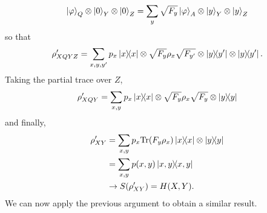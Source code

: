 \documentclass[a4paper, 12pt]{article}
\numberwithin{equation}{section}
\numberwithin{figure}{section}
\theoremstyle{definition}
\begin{document}
    \begin{align}
        \ket{\varphi}_Q \otimes \ket{0}_Y \otimes \ket{0}_Z = \sum_y \sqrt{F_y} \ket{\varphi}_A \otimes \ket{y}_Y \otimes \ket{y}_Z
    \end{align}
    so that
    \begin{align}
        \rho'_{XQYZ} = \sum_{x, y, y'} p_x \dyad{x}{x} \otimes \sqrt{F_y} \rho_x \sqrt{F_{y'}} \otimes \dyad{y}{y'} \otimes \dyad{y}{y'}.
    \end{align}
    Taking the partial trace over $Z$,
    \begin{align}
        \rho'_{XQY} = \sum_{x, y} p_x \dyad{x}{x} \otimes \sqrt{F_y} \rho_x \sqrt{F_y} \otimes \dyad{y}{y}
    \end{align}
    and finally,
    \begin{align}
        \rho'_{XY} &= \sum_{x, y} p_x \text{Tr}(F_y \rho_x) \dyad{x}{x} \otimes \dyad{y}{y} \\
        &= \sum_{x, y} p(x, y) \dyad{x, y}{x, y} \\
        &\to S(\rho'_{XY}) = H(X, Y).
    \end{align}
    We can now apply the previous argument to obtain a similar result.
\end{document}
